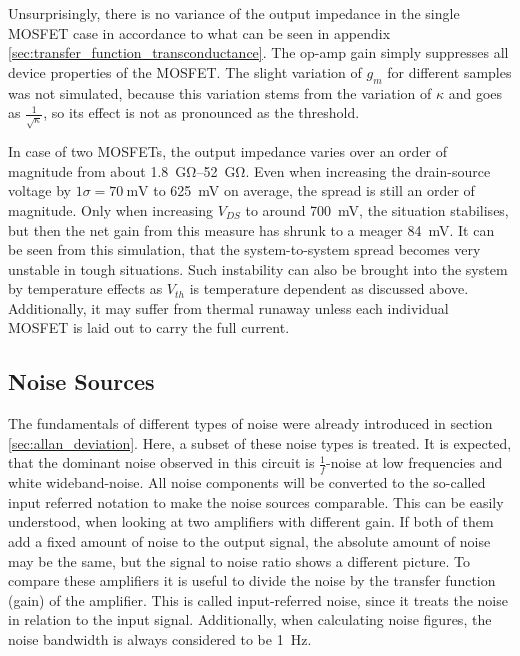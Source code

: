 Unsurprisingly, there is no variance of the output impedance in the single MOSFET case in accordance to what can be seen in appendix \ref{sec:transfer_function_transconductance}. The op-amp gain simply suppresses all device properties of the MOSFET. The slight variation of $g_m$ for different samples was not simulated, because this variation stems from the variation of $\kappa$ and goes as $\frac{1}{\sqrt{\kappa}}$, so its effect is not as pronounced as the threshold.

In case of two MOSFETs, the output impedance varies over an order of magnitude from about \qtyrange[range-units = single]{1.8}{52}{\giga \ohm}. Even when increasing the drain-source voltage by $1 \sigma = \qty{70}{\mV}$ to \qty{625}{\mV} on average, the spread is still an order of magnitude. Only when increasing $V_{DS}$ to around \qty{700}{\mV}, the situation stabilises, but then the net gain from this measure has shrunk to a meager \qty{84}{\mV}. It can be seen from this simulation, that the system-to-system spread becomes very unstable in tough situations. Such instability can also be brought into the system by temperature effects as $V_{th}$ is temperature dependent as discussed above. Additionally, it may suffer from thermal runaway unless each individual MOSFET is laid out to carry the full current.

\subsection{Noise Sources}%
\label{sec:current_source_noise}
The fundamentals of different types of noise were already introduced in section \ref{sec:allan_deviation}. Here, a subset of these noise types is treated. It is expected, that the dominant noise observed in this circuit is $\frac{1}{f}$-noise at low frequencies and white wideband-noise. All noise components will be converted to the so-called input referred notation to make the noise sources comparable. This can be easily understood, when looking at two amplifiers with different gain. If both of them add a fixed amount of noise to the output signal, the absolute amount of noise may be the same, but the signal to noise ratio shows a different picture. To compare these amplifiers it is useful to divide the noise by the transfer function (gain) of the amplifier. This is called input-referred noise, since it treats the noise in relation to the input signal. Additionally, when calculating noise figures, the noise bandwidth is always considered to be \qty{1}{\Hz}.

